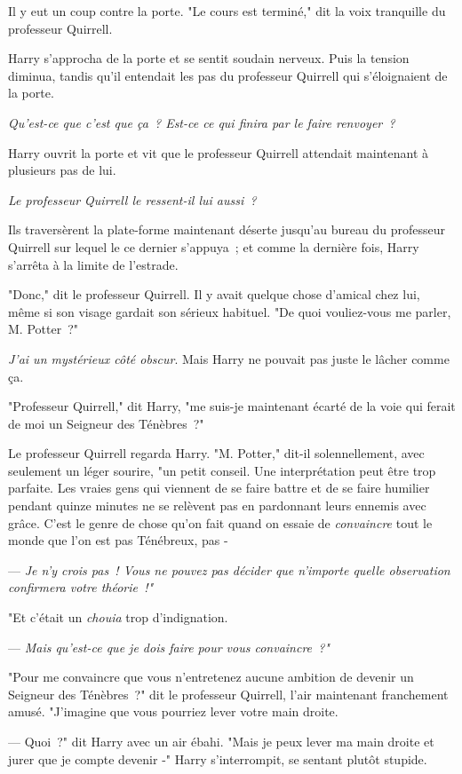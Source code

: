 Il y eut un coup contre la porte. "Le cours est terminé," dit la voix tranquille du professeur Quirrell.

Harry s'approcha de la porte et se sentit soudain nerveux. Puis la tension diminua, tandis qu'il entendait les pas du professeur Quirrell qui s'éloignaient de la porte.

\emph{Qu'est-ce que c'est que ça~? Est-ce ce qui finira par le faire renvoyer~?}

Harry ouvrit la porte et vit que le professeur Quirrell attendait maintenant à plusieurs pas de lui.

\emph{Le professeur Quirrell le ressent-il lui aussi~?}

Ils traversèrent la plate-forme maintenant déserte jusqu'au bureau du professeur Quirrell sur lequel le ce dernier s'appuya~; et comme la dernière fois, Harry s'arrêta à la limite de l'estrade.

"Donc," dit le professeur Quirrell. Il y avait quelque chose d'amical chez lui, même si son visage gardait son sérieux habituel. "De quoi vouliez-vous me parler, M. Potter~?"

\emph{J'ai un mystérieux côté obscur}. Mais Harry ne pouvait pas juste le lâcher comme ça.

"Professeur Quirrell," dit Harry, "me suis-je maintenant écarté de la voie qui ferait de moi un Seigneur des Ténèbres~?"

Le professeur Quirrell regarda Harry. "M. Potter," dit-il solennellement, avec seulement un léger sourire, "un petit conseil. Une interprétation peut être trop parfaite. Les vraies gens qui viennent de se faire battre et de se faire humilier pendant quinze minutes ne se relèvent pas en pardonnant leurs ennemis avec grâce. C'est le genre de chose qu'on fait quand on essaie de \emph{convaincre} tout le monde que l'on est pas Ténébreux, pas -

--- \emph{Je n'y crois pas~! Vous ne pouvez pas décider que n'importe quelle observation confirmera votre théorie~!"}

"Et c'était un \emph{chouia} trop d'indignation.

--- \emph{Mais qu'est-ce que je dois faire pour vous convaincre~?"}

"Pour me convaincre que vous n'entretenez aucune ambition de devenir un Seigneur des Ténèbres~?" dit le professeur Quirrell, l'air maintenant franchement amusé. "J'imagine que vous pourriez lever votre main droite.

--- Quoi~?" dit Harry avec un air ébahi. "Mais je peux lever ma main droite et jurer que je compte devenir -" Harry s'interrompit, se sentant plutôt stupide.


